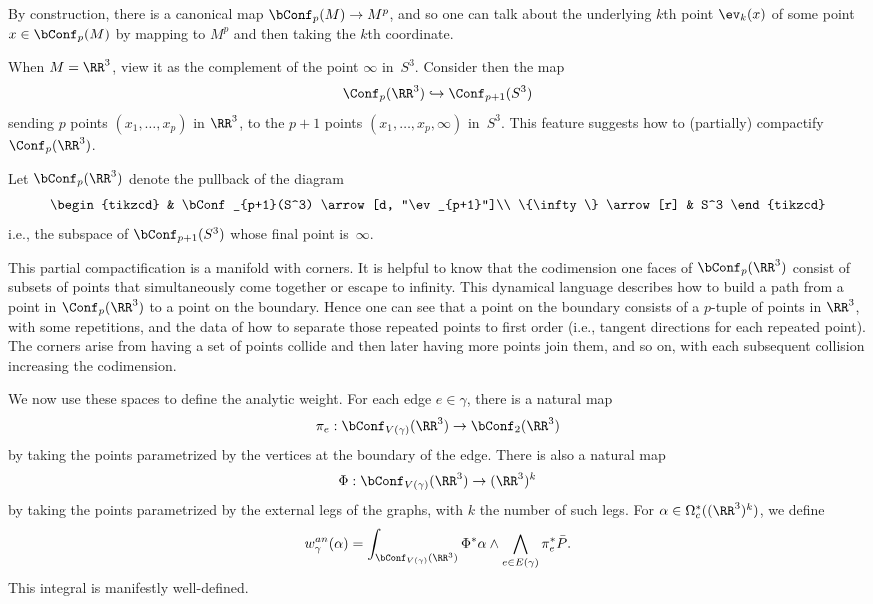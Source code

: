 \documentclass[10pt]{amsart}
\begin{document}
By construction, there is a canonical map $\bConf_p(M) \to M^p$, 
and so one can talk about the underlying $k$th point $\ev_k(x)$ of some point $x \in \bConf_p(M)$ by mapping to $M^p$ and then taking the $k$th coordinate.

When $M = \RR^3$, view it as the complement of the point $\infty$ in~$S^3$.
Consider then the map
\[
\Conf_p(\RR^3) \hookrightarrow \Conf_{p+1}(S^3)
\]
sending $p$ points $(x_1,\ldots,x_p)$ in $\RR^3$, 
to the $p+1$ points $(x_1,\ldots,x_p, \infty)$ in~$S^3$.
This feature suggests how to (partially) compactify~$\Conf_p(\RR^3)$.

\begin{dfn} 
Let $\bConf_p(\RR^3)$ denote the pullback of the diagram
\[
\begin{tikzcd}
& \bConf_{p+1}(S^3) \arrow[d, "\ev_{p+1}"]\\
\{\infty\} \arrow[r] & S^3 %
\end{tikzcd}
\]
i.e., the subspace of $\bConf_{p+1}(S^3)$ whose final point is~$\infty$.
\end{dfn}

This partial compactification is a manifold with corners.
It is helpful to know that the codimension one faces of $\bConf_p(\RR^3)$ consist of subsets of points that simultaneously come together or escape to infinity. 
This dynamical language describes how to build a path from a point in $\Conf_p(\RR^3)$ to a point on the boundary.
Hence one can see that a point on the boundary consists of a $p$-tuple of points in $\RR^3$, with some repetitions, and the data of how to separate those repeated points to first order (i.e., tangent directions for each repeated point).
The corners arise from having a set of points collide and then later having more points join them, and so on, with each subsequent collision increasing the codimension.

We now use these spaces to define the analytic weight.
For each edge $e \in \gamma$, there is a natural map 
\[
\pi_e: \bConf_{V(\gamma)}(\RR^3) \to \bConf_2(\RR^3)
\]
by taking the points parametrized by the vertices at the boundary of the edge.
There is also a natural map
\[
\Phi: \bConf_{V(\gamma)}(\RR^3) \to (\RR^3)^k
\]
by taking the points parametrized by the external legs of the graphs, with $k$ the number of such legs.
For $\alpha \in \Omega^*_c((\RR^3)^k)$, we define
\[
w^{an}_\gamma(\alpha) = \int_{\bConf_{V(\gamma)}(\RR^3)} \Phi^*\alpha \wedge \bigwedge_{e \in E(\gamma)} \pi_e^* \bar{P}.
\]
This integral is manifestly well-defined.
\end{document}
